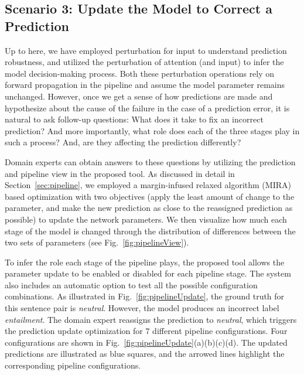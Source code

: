 





\subsection{Scenario 3: Update the Model to Correct a Prediction}
Up to here, we have employed perturbation for input to understand prediction robustness, and utilized the perturbation of attention (and input) to infer the model decision-making process. Both these perturbation operations rely on forward propagation in the pipeline and assume the model parameter remains unchanged.
%
However, once we get a sense of how predictions are made and hypothesize about the cause of the failure in the case of a prediction error, it is natural to ask follow-up questions: What does it take to fix an incorrect prediction? And more importantly, what role does each of the three stages play in such a process? And, are they affecting the prediction differently?

Domain experts can obtain answers to these questions by utilizing the prediction and pipeline view in the proposed tool. As discussed in detail in Section~\ref{sec:pipeline}, we employed a margin-infused relaxed algorithm (MIRA) based optimization with two objectives (apply the least amount of change to the parameter, and make the new prediction as close to the reassigned prediction as possible) to update the network parameters.
%
We then visualize how much each stage of the model is changed through the distribution of differences between the two sets of parameters (see Fig.~\ref{fig:pipelineView}).

To infer the role each stage of the pipeline plays, the proposed tool allows the parameter update to be enabled or disabled for each pipeline stage.
The system also includes an automatic option to test all the possible configuration combinations. As illustrated in Fig.~\ref{fig:pipelineUpdate}, the ground truth for this sentence pair is \emph{neutral}. However, the model produces an incorrect label \emph{entailment}. The domain expert reassigns the prediction to \emph{neutral}, which triggers the prediction update optimization for $7$ different pipeline configurations. Four configurations are shown in Fig.~\ref{fig:pipelineUpdate}(a)(b)(c)(d). The updated predictions are illustrated as blue squares, and the arrowed lines highlight the corresponding pipeline configurations.

